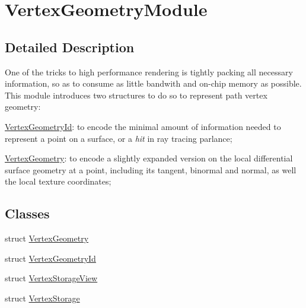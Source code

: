 \hypertarget{group___vertex_geometry_module}{}\section{Vertex\+Geometry\+Module}
\label{group___vertex_geometry_module}


\subsection{Detailed Description}
\begin{DoxyParagraph}{}
One of the tricks to high performance rendering is tightly packing all necessary information, so as to consume as little bandwith and on-\/chip memory as possible. This module introduces two structures to do so to represent path vertex geometry\+: 
\end{DoxyParagraph}
\begin{DoxyParagraph}{}

\begin{DoxyItemize}
\item \hyperlink{struct_vertex_geometry_id}{Vertex\+Geometry\+Id}\+: to encode the minimal amount of information needed to represent a point on a surface, or a {\itshape hit} in ray tracing parlance;
\item \hyperlink{struct_vertex_geometry}{Vertex\+Geometry}\+: to encode a slightly expanded version on the local differential surface geometry at a point, including its tangent, binormal and normal, as well the local texture coordinates; 
\end{DoxyItemize}
\end{DoxyParagraph}
\subsection*{Classes}
\begin{DoxyCompactItemize}
\item 
struct \hyperlink{struct_vertex_geometry}{Vertex\+Geometry}
\item 
struct \hyperlink{struct_vertex_geometry_id}{Vertex\+Geometry\+Id}
\item 
struct \hyperlink{struct_vertex_storage_view}{Vertex\+Storage\+View}
\item 
struct \hyperlink{struct_vertex_storage}{Vertex\+Storage}
\end{DoxyCompactItemize}
